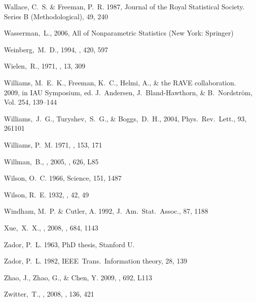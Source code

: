 \begin{thebibliography}{99}
{Wallace}, C.~S. \& {Freeman}, P.~R. 1987, Journal of the Royal Statistical
  Society. Series B (Methodological), 49, 240

  Wasserman,~L., 2006,
  All of Nonparametric Statistics (New York: Springer)

  Weinberg,~M.~D., 1994,
  \apj, 420, 597

  Wielen,~R., 1971, \aap, 13, 309

{Williams}, M.~E.~K., {Freeman}, K.~C., {Helmi}, A., \& {the RAVE
  collaboration}. 2009, in IAU Symposium, ed. J.~{Andersen},
  J.~{Bland-Hawthorn}, \& B.~{Nordstr{\"o}m}, Vol. 254, 139--144

  Williams,~J.~G., Turyshev,~S.~G., \& Boggs,~D.~H., 2004,
  Phys.~Rev.~Lett., 93, 261101

{Williams}, P.~M. 1971, \mnras, 153, 171

  Willman,~B., \etal, 2005,
  \apjl, 626, L85

{Wilson}, O.~C. 1966, Science, 151, 1487

{Wilson}, R.~E. 1932, \aj, 42, 49

{Windham}, M.~P. \& {Cutler}, A. 1992, {J.~Am.~Stat.~Assoc.}, 87, 1188

 Xue,~X.~X., \etal, 2008, 
  \apj, 684, 1143

{Zador}, P.~L. 1963, PhD thesis, Stanford U.

{Zador}, P.~L. 1982, {IEEE~Trans.~Information theory}, 28, 139

{Zhao}, J., {Zhao}, G., \& {Chen}, Y. 2009, \apjl, 692, L113

  Zwitter,~T., \etal, 2008, \aj, 136, 421


\end{thebibliography}
